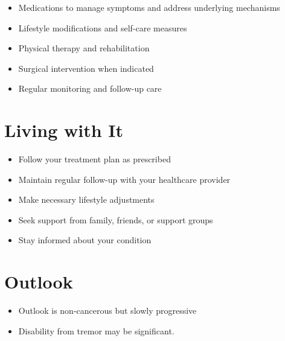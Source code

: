 \begin{itemize}[noitemsep]
  \item Medications to manage symptoms and address underlying mechanisms
  \item Lifestyle modifications and self-care measures
  \item Physical therapy and rehabilitation
  \item Surgical intervention when indicated
  \item Regular monitoring and follow-up care
\end{itemize}
\section{Living with It}
\begin{itemize}[noitemsep]
  \item Follow your treatment plan as prescribed
  \item Maintain regular follow-up with your healthcare provider
  \item Make necessary lifestyle adjustments
  \item Seek support from family, friends, or support groups
  \item Stay informed about your condition
\end{itemize}
\section{Outlook}
\begin{itemize}[noitemsep]
  \item Outlook is non-cancerous but slowly progressive
  \item Disability from tremor may be significant.
\end{itemize}
